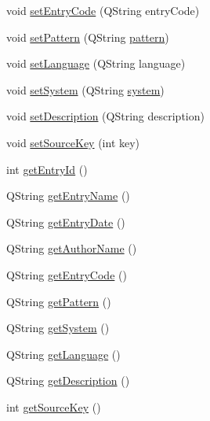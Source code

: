 \begin{DoxyCompactItemize}
\item 
void \hyperlink{class_entry_entity_a705759132ac39477ace6b35a431ac5f6}{set\+Entry\+Code} (Q\+String entry\+Code)
\item 
void \hyperlink{class_entry_entity_a255b536a9474e681bf5023f55188a1c6}{set\+Pattern} (Q\+String \hyperlink{class_entry_entity_a65f0a241d2a05f7b2da01e5868acfe5c}{pattern})
\item 
void \hyperlink{class_entry_entity_a0a4e25af4be8c937f2dcdcfb054b5d49}{set\+Language} (Q\+String language)
\item 
void \hyperlink{class_entry_entity_aa99b5179f72cdc9aebcae8618402dde9}{set\+System} (Q\+String \hyperlink{class_entry_entity_ab925c61d96e3e82745d185e931ef1e64}{system})
\item 
void \hyperlink{class_entry_entity_a814f4b55969c9da7785cf299e450f6a1}{set\+Description} (Q\+String description)
\item 
void \hyperlink{class_entry_entity_a55b1678e5b67b722c0b76a54b85061d3}{set\+Source\+Key} (int key)
\item 
int \hyperlink{class_entry_entity_a6153d3a94a44c9774e39f0ae0de2e0ad}{get\+Entry\+Id} ()
\item 
Q\+String \hyperlink{class_entry_entity_a1f07642efaed25e9725ed130258c4f3f}{get\+Entry\+Name} ()
\item 
Q\+String \hyperlink{class_entry_entity_a3f1c1dd15ed91ce6215d6e44dd3b2be7}{get\+Entry\+Date} ()
\item 
Q\+String \hyperlink{class_entry_entity_a0cfdd408fe4a6daf0f859c1fbb2b0773}{get\+Author\+Name} ()
\item 
Q\+String \hyperlink{class_entry_entity_a0f6a2ead8b72da01c9b5461e3b0ceac2}{get\+Entry\+Code} ()
\item 
Q\+String \hyperlink{class_entry_entity_a8386a3a73fbd18e2c567ab93db643e2b}{get\+Pattern} ()
\item 
Q\+String \hyperlink{class_entry_entity_a90856a316a8dc5ccb78236ad8399dbb9}{get\+System} ()
\item 
Q\+String \hyperlink{class_entry_entity_a8d72297bafb99e6e6761f8b9f32888ef}{get\+Language} ()
\item 
Q\+String \hyperlink{class_entry_entity_a7636ecdfd90c39b1548264d5be9bc05d}{get\+Description} ()
\item 
int \hyperlink{class_entry_entity_a4cd1f6dfc7c40981239415b265fe32c1}{get\+Source\+Key} ()
\end{DoxyCompactItemize}
